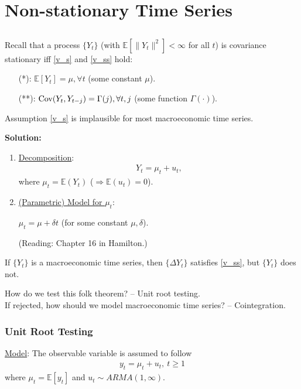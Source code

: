 \documentclass[11pt]{elegantbook}
\begin{document}
\chapter{Non-stationary Time Series}
\section{}
Recall that a process $\{Y_t\}$ (with $\mathbb{E}[\|Y_t\|^2]<\infty$ for all $t$) is covariance stationary iff \eqref{v_s} and \eqref{v_ss} hold:
\begin{enumerate}
    \item[(*):] $\mathbb{E}[Y_t]=\mu,\forall t$ (some constant $\mu$).
    \item[(**):] $\textnormal{Cov}(Y_t,Y_{t-j})=\Gamma(j),\forall t,j$ (some function $\Gamma(\cdot)$).
\end{enumerate}

\begin{claim}
    Assumption \eqref{v_s} is implausible for most macroeconomic time series.
\end{claim}
\textbf{Solution:}
\begin{enumerate}
    \item \underline{Decomposition}:
    \begin{equation}
        \begin{aligned}
            Y_t=\mu_t+u_t,
        \end{aligned}
        \nonumber
    \end{equation}
    where $\mu_t=\mathbb{E}(Y_t)$ ($\Rightarrow \mathbb{E}(u_t)=0$).
    \item \underline{(Parametric) Model for $\mu_t$}:
    \begin{example}
        $\mu_t=\mu+\delta t$ (for some constant $\mu,\delta$).
    \end{example}
    (Reading: Chapter 16 in Hamilton.)
\end{enumerate}

\begin{theorem}
    If $\{Y_t\}$ is a macroeconomic time series, then $\{\Delta Y_t\}$ satisfies \eqref{v_ss}, but $\{Y_t\}$ does not.
\end{theorem}
How do we test this folk theorem? -- Unit root testing.\\
If rejected, how should we model macroeconomic time series? -- Cointegration.

\subsection{Unit Root Testing}
\underline{Model}: The observable variable is assumed to follow
\begin{equation}
    \begin{aligned}
        y_t=\mu_t+u_t,\ t\geq 1
    \end{aligned}
    \nonumber
\end{equation}
where $\mu_t=\mathbb{E}[y_t]$ and $u_t\sim ARMA(1,\infty)$.
\end{document}
